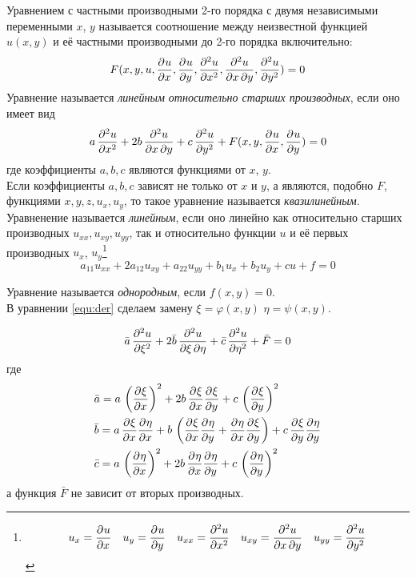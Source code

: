 Уравнением с частными производными 2-го порядка с двумя независимыми переменными $x$, $y$ называется соотношение между неизвестной функцией $u(x, y)$ и её частными производными до 2-го порядка включительно:
\[
	F(x, y, u, \frac{\partial^{}u}{\partial x^{}}, \frac{\partial^{}u}{\partial y^{}}, \frac{\partial^{2}u}{\partial x^{2}}, \frac{\partial^2u}{\partial x\, \partial y} ,\frac{\partial^{2}u}{\partial y^{2}}) = 0
\]
Уравнение называется \textit{линейным относительно старших производных}, если оно имеет вид
\begin{equation} 
	\label{equ:der} 
	a\, \frac{\partial^{2}u}{\partial x^{2}}+ 2 b\, \frac{\partial^2u}{\partial x\, \partial y} +c\, \frac{\partial^{2}u}{\partial y^{2}} + F(x, y, \frac{\partial^{}u}{\partial x^{}}, \frac{\partial^{}u}{\partial y^{}}) = 0
\end{equation}
где коэффициенты $a, b, c$ являются функциями от $x$, $y$.\\

Если коэффициенты $a, b, c$ зависят не только от $x$ и $y$, а являются, подобно $F$, функциями $x, y, z, u_x, u_y$, то такое уравнение называется \textit{квазилинейным}.\\

Уравненение называется \textit{линейным}, если оно линейно как относительно старших производных $u_{xx}, u_{xy}, u_{yy}$, так и относительно функции $u$ и её первых производных $u_x$, $u_y$\footnote{\[u_x = \frac{\partial^{}u}{\partial x^{}} \quad u_y = \frac{\partial^{}u}{\partial y^{}} \quad u_{xx} = \frac{\partial^{2}u}{\partial x^{2}} \quad u_{xy} = \frac{\partial^2u}{\partial x\, \partial y} \quad u_{yy} = \frac{\partial^{2}u}{\partial y^{2}}\]}
\[
	a_{11} u_{xx} + 2 a_{12} u_{xy} + a_{22} u_{yy} + b_1 u_x + b_2 u_y + c u + f = 0
\]

Уравнение называется \textit{однородным}, если $f(x, y) = 0$.\\


В уравнении \eqref{equ:der} сделаем замену $\xi = \varphi(x,y)$ $\eta = \psi(x,y)$.

\[
	\bar{a}\, \frac{\partial^{2}u}{\partial \xi^{2}} + 2 \bar{b}\, \frac{\partial^2u}{\partial \xi\, \partial \eta} + \bar{c}\, \frac{\partial^{2}u}{\partial \eta^{2}} + \bar F = 0
\]
где
\begin{align*} \setlength\itemsep{0pt}			
	&\bar{a} = a\, \left( \derp{\xi}{x}{}\right)^2 + 2 b\, \derp{\xi}{x}{} \derp{\xi}{y}{} + c\, \left( \derp{\xi}{y}{} \right)^2\\
	&\bar{b} = a\, \derp{\xi}{x}{} \derp{\eta}{x}{}+ b\, \left(\derp{\xi}{x}{} \derp{\eta}{y}{} + \derp{\eta}{x}{} \derp{\xi}{y}{} \right)+ c\, \derp{\xi}{y}{} \derp{\eta}{y}{}\\
	&\bar{c} = a\, \left( \derp{\eta}{x}{} \right)^2 + 2 b\, \derp{\eta}{x}{} \derp{\eta}{y}{}  + c\, \left( \derp{\eta}{y}{} \right)^2\\
\end{align*}
а функция $\bar F$ не зависит от вторых производных.

